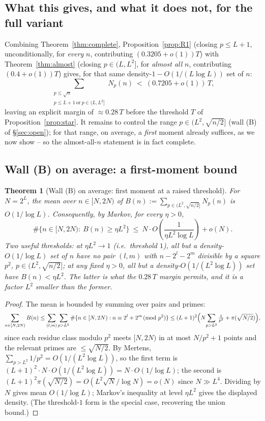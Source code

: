 \documentclass[11pt]{article}
\theoremstyle{plain}
\newtheorem{theorem}{Theorem}[section]
\theoremstyle{definition}
\theoremstyle{remark}
\begin{document}
\subsection{What this gives, and what it does not, for the full variant}

Combining Theorem~\ref{thm:complete}, Proposition~\ref{prop:R1} (closing
$p\le L+1$, unconditionally, for \emph{every} $n$, contributing
$(0.3205+o(1))T$) with Theorem~\ref{thm:almost} (closing $p\in(L,L^2]$, for
\emph{almost all} $n$, contributing $(0.4+o(1))T$) gives, for that same
density-$1-O(1/(L\log L))$ set of $n$:
\[
\sum_{\substack{p\le\sqrt n\\ p\le L+1\ \mathrm{or}\ p\in(L,L^2]}}N_p(n)
\ <\ (0.7205+o(1))\,T,
\]
leaving an explicit margin of $\approx0.28\,T$ before the threshold
$T$ of Proposition~\ref{prop:star}. It remains to control the range
$p\in(L^2,\sqrt{n/2}]$ (wall (B) of \S\ref{sec:open}); for that range, on
average, a \emph{first} moment already suffices, as we now show -- so the
almost-all-$n$ statement is in fact complete.

\subsection{Wall (B) on average: a first-moment bound}\label{sec:Bavg}

\begin{theorem}[Wall (B) on average: first moment at a raised threshold]\label{thm:Bavg}
For $N=2^L$, the mean over $n\in[N,2N)$ of
$B(n):=\sum_{p\in(L^2,\sqrt{n/2}]}N_p(n)$ is $O(1/\log L)$. Consequently, by
Markov, for every $\eta>0$,
\[
\#\bigl\{n\in[N,2N):\ B(n)\ge\eta L^2\bigr\}
\ \le\ N\cdot O\!\left(\frac1{\eta L^2\log L}\right)+o(N).
\]
Two useful thresholds: at $\eta L^2\to1$ (i.e.\ threshold $1$), all but a
density-$O(1/\log L)$ set of $n$ have \emph{no} pair $(l,m)$ with $n-2^l-2^m$
divisible by a square $p^2$, $p\in(L^2,\sqrt{n/2}]$; at any fixed $\eta>0$, all
but a density-$O(1/(L^2\log L))$ set have $B(n)<\eta L^2$. The latter is what the
$0.28\,T$ margin permits, and it is a factor $L^2$ smaller than the former.
\end{theorem}
\begin{proof}
The mean is bounded by summing over pairs and primes:
\[
\sum_{n\in[N,2N)}B(n)\le\sum_{(l,m)}\sum_{p>L^2}
\#\{n\in[N,2N):n\equiv2^l+2^m\!\!\pmod{p^2}\}
\le(L+1)^2\Bigl(N\!\sum_{p>L^2}\tfrac1{p^2}+\pi(\sqrt{N/2})\Bigr),
\]
since each residue class modulo $p^2$ meets $[N,2N)$ in at most $N/p^2+1$
points and the relevant primes are $\le\sqrt{N/2}$. By Mertens,
$\sum_{p>L^2}1/p^2=O(1/(L^2\log L))$, so the first term is
$(L+1)^2\cdot N\cdot O(1/(L^2\log L))=N\cdot O(1/\log L)$; the second is
$(L+1)^2\pi(\sqrt{N/2})=O(L^2\sqrt N/\log N)=o(N)$ since $N\gg L^4$. Dividing by
$N$ gives mean $O(1/\log L)$; Markov's inequality at level $\eta L^2$ gives the
displayed density. (The threshold-$1$ form is the special case, recovering the
union bound.)
\end{proof}
\end{document}
